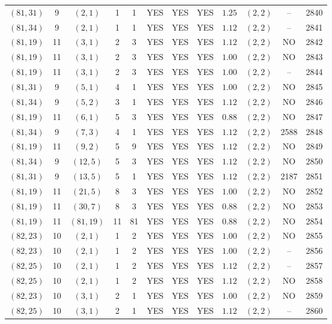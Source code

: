 \begin{longtable}{|c|c|c|c|c|c|c|c|c|c|c|c|}
$(81,31)$ & 9 & $(2,1)$ & 1 & 1 & YES & YES & YES & $1.25$ & $(2,2)$ & -- & 2840\\
$(81,34)$ & 9 & $(2,1)$ & 1 & 1 & YES & YES & YES & $1.12$ & $(2,2)$ & -- & 2841\\
$(81,19)$ & 11 & $(3,1)$ & 2 & 3 & YES & YES & YES & $1.12$ & $(2,2)$ & NO & 2842\\
$(81,19)$ & 11 & $(3,1)$ & 2 & 3 & YES & YES & YES & $1.00$ & $(2,2)$ & NO & 2843\\
$(81,19)$ & 11 & $(3,1)$ & 2 & 3 & YES & YES & YES & $1.00$ & $(2,2)$ & -- & 2844\\
$(81,31)$ & 9 & $(5,1)$ & 4 & 1 & YES & YES & YES & $1.00$ & $(2,2)$ & NO & 2845\\
$(81,34)$ & 9 & $(5,2)$ & 3 & 1 & YES & YES & YES & $1.12$ & $(2,2)$ & NO & 2846\\
$(81,19)$ & 11 & $(6,1)$ & 5 & 3 & YES & YES & YES & $0.88$ & $(2,2)$ & NO & 2847\\
$(81,34)$ & 9 & $(7,3)$ & 4 & 1 & YES & YES & YES & $1.12$ & $(2,2)$ & 2588 & 2848\\
$(81,19)$ & 11 & $(9,2)$ & 5 & 9 & YES & YES & YES & $1.12$ & $(2,2)$ & NO & 2849\\
$(81,34)$ & 9 & $(12,5)$ & 5 & 3 & YES & YES & YES & $1.12$ & $(2,2)$ & NO & 2850\\
$(81,31)$ & 9 & $(13,5)$ & 5 & 1 & YES & YES & YES & $1.12$ & $(2,2)$ & 2187 & 2851\\
$(81,19)$ & 11 & $(21,5)$ & 8 & 3 & YES & YES & YES & $1.00$ & $(2,2)$ & NO & 2852\\
$(81,19)$ & 11 & $(30,7)$ & 8 & 3 & YES & YES & YES & $0.88$ & $(2,2)$ & NO & 2853\\
$(81,19)$ & 11 & $(81,19)$ & 11 & 81 & YES & YES & YES & $0.88$ & $(2,2)$ & NO & 2854\\
$(82,23)$ & 10 & $(2,1)$ & 1 & 2 & YES & YES & YES & $1.00$ & $(2,2)$ & NO & 2855\\
$(82,23)$ & 10 & $(2,1)$ & 1 & 2 & YES & YES & YES & $1.00$ & $(2,2)$ & -- & 2856\\
$(82,25)$ & 10 & $(2,1)$ & 1 & 2 & YES & YES & YES & $1.12$ & $(2,2)$ & -- & 2857\\
$(82,25)$ & 10 & $(2,1)$ & 1 & 2 & YES & YES & YES & $1.12$ & $(2,2)$ & NO & 2858\\
$(82,23)$ & 10 & $(3,1)$ & 2 & 1 & YES & YES & YES & $1.00$ & $(2,2)$ & NO & 2859\\
$(82,25)$ & 10 & $(3,1)$ & 2 & 1 & YES & YES & YES & $1.12$ & $(2,2)$ & -- & 2860\\

\end{longtable}
